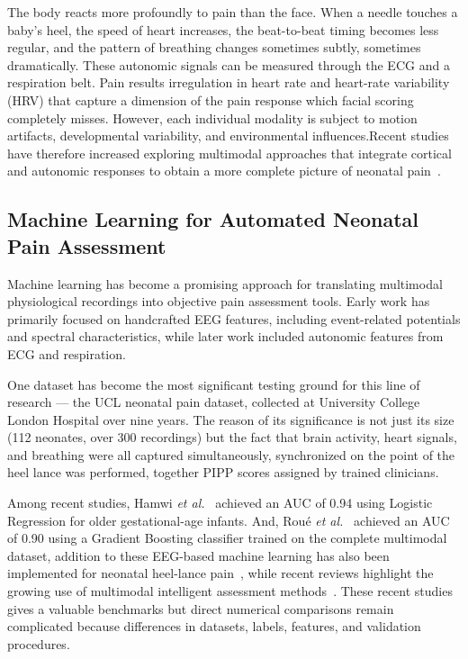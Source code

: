 \documentclass[conference]{IEEEtran}
\begin{document}
The body reacts more profoundly to pain than the face. When a needle touches a baby's heel, the speed of heart increases, the beat-to-beat timing becomes less regular, and the pattern of breathing changes sometimes subtly, sometimes dramatically. These autonomic signals can be measured through the ECG and a respiration belt. Pain results irregulation in heart rate and heart-rate variability (HRV)\cite{taskforce1996hrv} that capture a dimension of the pain response which facial scoring completely misses.
However, each individual modality is subject to motion artifacts, developmental variability, and environmental influences.Recent studies have therefore increased exploring multimodal approaches that integrate cortical and autonomic responses to obtain a more complete picture of neonatal pain~\cite{zhou2026}.

\subsection{Machine Learning for Automated Neonatal Pain Assessment}

Machine learning has become a promising approach for translating multimodal physiological recordings into objective pain assessment tools. Early work has primarily focused on handcrafted EEG features, including event-related potentials and spectral characteristics, while later work included autonomic features from ECG and respiration.

One dataset has become the most significant testing ground for this line of research — the UCL neonatal pain dataset, collected at University College London Hospital over nine years. The reason of its significance is not just its size (112 neonates, over 300 recordings) but the fact that brain activity, heart signals, and breathing were all captured simultaneously, synchronized on the point of the heel lance was performed, together PIPP scores assigned by trained clinicians.

Among recent studies, Hamwi \textit{et al.}~\cite{hamwi2025eeg} achieved an AUC of 0.94 using Logistic Regression for older gestational-age infants. And, Roué \textit{et al.}~\cite{roue2025objective} achieved an AUC of 0.90 using a Gradient Boosting classifier trained on the complete multimodal dataset, addition to these EEG-based machine learning has also been implemented for neonatal heel-lance pain~\cite{shafiee2024}, while recent reviews highlight the growing use of multimodal intelligent assessment methods~\cite{zhou2026}. These recent studies gives a valuable benchmarks but direct  numerical comparisons remain complicated because differences in datasets, labels, features, and validation procedures.
\end{document}
